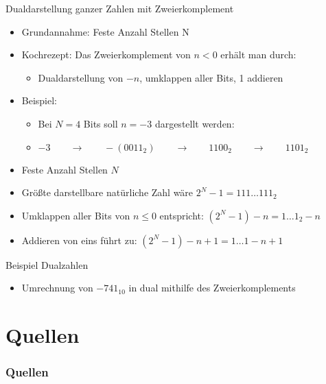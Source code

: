 \documentclass[12pt%
,aspectratio=169%
]{beamer}
\begin{document}
\begin{frame}{Dualdarstellung ganzer Zahlen mit Zweierkomplement}
\begin{itemize}
	\item Grundannahme: Feste Anzahl Stellen N
	\item Kochrezept: Das Zweierkomplement von $n < 0$ erhält man durch:
	\begin{itemize}
		\item Dualdarstellung von $-n$, umklappen aller Bits, 1 addieren
	\end{itemize}
	\item Beispiel:
	\begin{itemize}
		\item Bei $N = 4$ Bits soll $n = -3$ dargestellt werden:
		\item $-3 \qquad \to \qquad -(0011_2) \qquad \to \qquad 1100_2 \qquad \to \qquad 1101_2$
	\end{itemize}
\end{itemize}
\end{frame}

\begin{frame}
	\begin{itemize}
		\item Feste Anzahl Stellen $N$
		\item Größte darstellbare natürliche Zahl wäre $2^N - 1 = 111 \ldots 111_2$
		\item Umklappen aller Bits von $n \leq 0$ entspricht: $(2^N - 1) - n = 1 \ldots 1_2 - n$
		\item Addieren von eins führt zu: $(2^N - 1) - n + 1 = 1 \ldots 1 - n + 1$
	\end{itemize}
\end{frame}

\begin{frame}{Beispiel Dualzahlen}
\begin{itemize}
	\item Umrechnung von $-741_{10}$ in dual mithilfe des Zweierkomplements
\end{itemize}
\end{frame}


\section*{Quellen}
\appendix
\begin{frame}[allowframebreaks]
  \frametitle<presentation>{Quellen}
\printbibliography
\end{frame}
\end{document}

